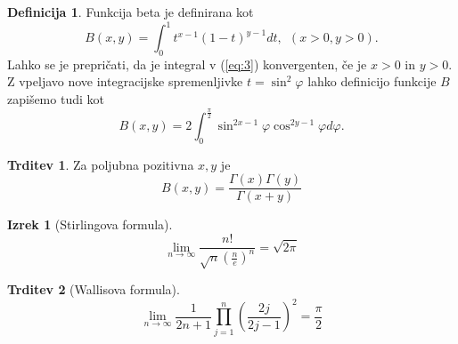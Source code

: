 \documentclass[11pt]{article}
\theoremstyle{definition}
\newtheorem{definicija}{Definicija}[section]
\theoremstyle{definition}
\newtheorem{trditev}{Trditev}[section]
\theoremstyle{definition}
\newtheorem{izrek}{Izrek}[section]
\begin{document}
\begin{definicija}

Funkcija beta je definirana kot
\begin{equation} \label{eq:3}
	B(x, y) = \int_0^1 t^{x-1} (1-t)^{y-1} dt, ~~(x>0, y>0).
\end{equation}
Lahko se je prepričati, da je integral v (\ref{eq:3}) konvergenten, če je $x > 0$ in $y > 0$. \\

Z vpeljavo nove integracijske spremenljivke $t = \sin^2{\varphi}$ lahko definicijo funkcije $B$ zapišemo tudi kot
\begin{equation} \label{eq:4}
	B(x, y) = 2 \int_0^{\frac{\pi}{2}} \sin^{2x-1}{\varphi} \cos^{2y-1}{\varphi} d\varphi.
\end{equation}

\end{definicija}
\vspace{0.5cm}

\begin{trditev}

Za poljubna pozitivna $x, y$ je 
\begin{equation} \label{eq:5}
	B(x, y) = \frac{\Gamma(x)\Gamma(y)}{\Gamma(x+y)}
\end{equation}

\end{trditev}
\vspace{0.5cm} 

\begin{izrek}[Stirlingova formula]

$$\lim_{n \rightarrow \infty} \frac{n!}{\sqrt{n} (\frac{n}{e})^n} = \sqrt{2 \pi}$$

\end{izrek}
\vspace{0.5cm}

\begin{trditev}[Wallisova formula]

$$\lim_{n \rightarrow \infty} \frac{1}{2n+1} \prod_{j=1}^n \left( \frac{2j}{2j-1} \right)^2 = \frac{\pi}{2}$$

\end{trditev}
\vspace{0.5cm}


\pagebreak

\end{document}

